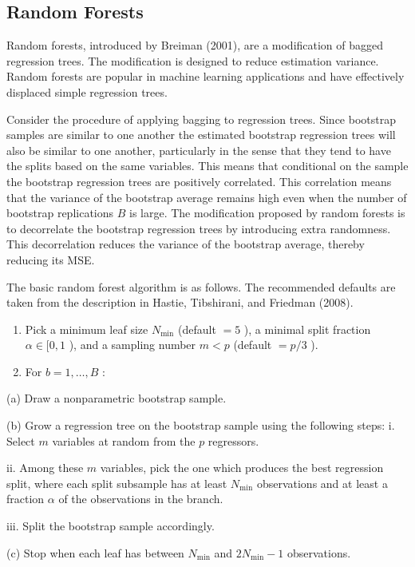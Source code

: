 \documentclass[10pt]{article}
\begin{document}
\subsection{Random Forests}
Random forests, introduced by Breiman (2001), are a modification of bagged regression trees. The modification is designed to reduce estimation variance. Random forests are popular in machine learning applications and have effectively displaced simple regression trees.

Consider the procedure of applying bagging to regression trees. Since bootstrap samples are similar to one another the estimated bootstrap regression trees will also be similar to one another, particularly in the sense that they tend to have the splits based on the same variables. This means that conditional on the sample the bootstrap regression trees are positively correlated. This correlation means that the variance of the bootstrap average remains high even when the number of bootstrap replications $B$ is large. The modification proposed by random forests is to decorrelate the bootstrap regression trees by introducing extra randomness. This decorrelation reduces the variance of the bootstrap average, thereby reducing its MSE.

The basic random forest algorithm is as follows. The recommended defaults are taken from the description in Hastie, Tibshirani, and Friedman (2008).

\begin{enumerate}
  \item Pick a minimum leaf size $N_{\min }$ (default $=5$ ), a minimal split fraction $\alpha \in[0,1$ ), and a sampling number $m<p$ (default $=p / 3$ ).

  \item For $b=1, \ldots, B$ :

\end{enumerate}

(a) Draw a nonparametric bootstrap sample.

(b) Grow a regression tree on the bootstrap sample using the following steps: i. Select $m$ variables at random from the $p$ regressors.

ii. Among these $m$ variables, pick the one which produces the best regression split, where each split subsample has at least $N_{\min }$ observations and at least a fraction $\alpha$ of the observations in the branch.

iii. Split the bootstrap sample accordingly.

(c) Stop when each leaf has between $N_{\min }$ and $2 N_{\min }-1$ observations.
\end{document}
